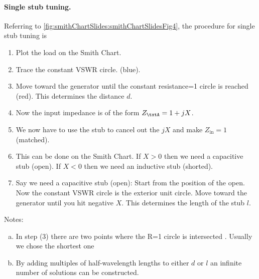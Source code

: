 \paragraph{Single stub tuning.}

Referring to \cref{fig:smithChartSlides:smithChartSlidesFig4}, the procedure for single stub tuning is


\begin{enumerate}
\item Plot the load on the Smith Chart.
\item Trace the constant VSWR circle. (blue).
\item Move toward the generator until the constant resistance=1 circle is reached (red).  This determines the distance \(d\).
\item Now the input impedance is of the form \(Z_\txtA = 1 + j X\).
\item We now have to use the stub to cancel out the \( j X \) and make \( Z_{\textrm{in}} = 1 \) (matched).
\item This can be done on the Smith Chart. If \( X>0 \) then we need a capacitive stub (open). If \( X<0 \) then we need an inductive stub (shorted).
\item Say we need a capacitive stub (open): Start from the position of the open. Now the constant VSWR circle is the exterior unit
circle. Move toward the generator until you hit negative \( X \). This determines the length of the stub \( l \).
\end{enumerate}

Notes:
\begin{enumerate}[(a)]
\item In step (3) there are two points where the R=1 circle is intersected . Usually we chose the shortest one
\item By adding multiples of half-wavelength lengths to either \(d\) or \(l\) an infinite number of solutions can be constructed.
\end{enumerate}


